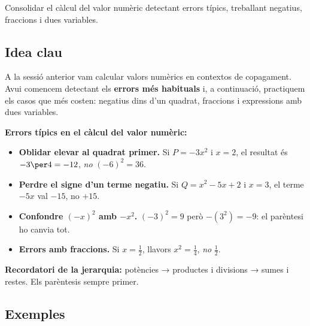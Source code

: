 %
{Consolidar el càlcul del valor numèric detectant errors típics, treballant
negatius, fraccions i dues variables.}

\subsection{Idea clau}

A la sessió anterior vam calcular valors numèrics en contextos de copagament.
Avui comencem detectant els \textbf{errors més habituals} i, a continuació,
practiquem els casos que més costen: negatius dins d'un quadrat, fraccions
i expressions amb dues variables.

\begin{idea}
\textbf{Errors típics en el càlcul del valor numèric:}
\begin{itemize}[leftmargin=1.4em, itemsep=3pt]
  \item \textbf{Oblidar elevar al quadrat primer.} Si $P=-3x^2$ i $x=2$,
        el resultat és $-3\per 4 = -12$, \emph{no} $(-6)^2=36$.
  \item \textbf{Perdre el signe d'un terme negatiu.} Si $Q=x^2-5x+2$ i
        $x=3$, el terme $-5x$ val $-15$, no $+15$.
  \item \textbf{Confondre $(-x)^2$ amb $-x^2$.}
        $(-3)^2 = 9$ però $-(3^2) = -9$: el parèntesi ho canvia tot.
  \item \textbf{Errors amb fraccions.} Si $x=\tfrac{1}{2}$, llavors
        $x^2 = \tfrac{1}{4}$, \emph{no} $\tfrac{1}{2}$.
\end{itemize}
\textbf{Recordatori de la jerarquia:} potències → productes i divisions →
sumes i restes. Els parèntesis sempre primer.
\end{idea}

\subsection{Exemples}

